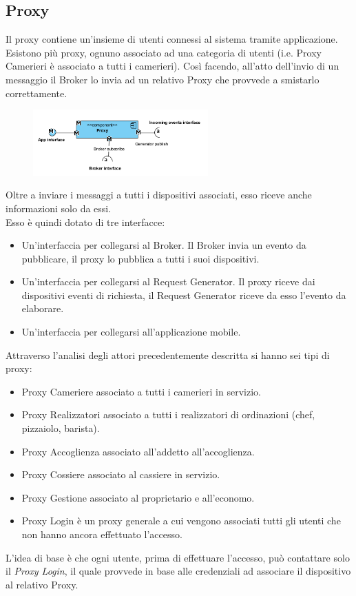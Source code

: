 \subsection{Proxy}
Il proxy contiene un'insieme di utenti connessi al sistema tramite applicazione. Esistono più proxy, ognuno associato ad una categoria di utenti (i.e. Proxy Camerieri è associato a tutti i camerieri). Così facendo, all'atto dell'invio di un messaggio il Broker lo invia ad un relativo Proxy che provvede a smistarlo correttamente. 
\begin{figure}[H]
	\centering
	\includegraphics[width=0.6\textwidth]{Immagini/proxy.png}
\end{figure}
Oltre a inviare i messaggi a tutti i dispositivi associati, esso riceve anche informazioni solo da essi.
\\Esso è quindi dotato di tre interfacce:
\begin{itemize}
	\item Un'interfaccia per collegarsi al Broker. Il Broker invia un evento da pubblicare, il proxy lo pubblica a tutti i suoi dispositivi.
	\item Un'interfaccia per collegarsi al Request Generator. Il proxy riceve dai dispositivi eventi di richiesta, il Request Generator riceve da esso l'evento da elaborare.
	\item Un'interfaccia per collegarsi all'applicazione mobile.
\end{itemize}
Attraverso l'analisi degli attori precedentemente descritta si hanno sei tipi di proxy:
\begin{itemize}
	\item Proxy Cameriere associato a tutti i camerieri in servizio.
	\item Proxy Realizzatori associato a tutti i realizzatori di ordinazioni (chef, pizzaiolo, barista).
	\item Proxy Accoglienza associato all'addetto all'accoglienza.
	\item Proxy Cossiere associato al cassiere in servizio.
	\item Proxy Gestione associato al proprietario e all'economo.
	\item Proxy Login è un proxy generale a cui vengono associati tutti gli utenti che non hanno ancora effettuato l'accesso.
\end{itemize}
L'idea di base è che ogni utente, prima di effettuare l'accesso, può contattare solo il \textit{Proxy Login}, il quale provvede in base alle credenziali ad associare il dispositivo al relativo Proxy.

